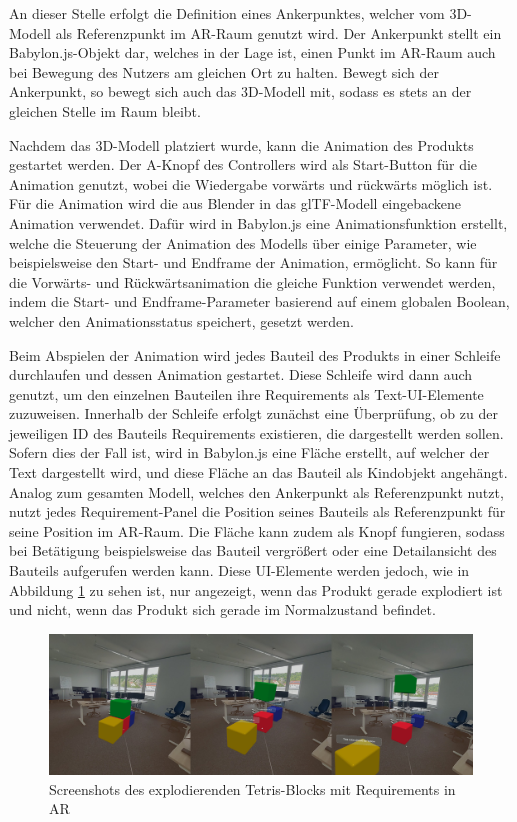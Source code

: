 An dieser Stelle erfolgt die Definition eines Ankerpunktes, welcher vom 3D-Modell als Referenzpunkt im AR-Raum genutzt wird.
Der Ankerpunkt stellt ein Babylon.js-Objekt dar, welches in der Lage ist, einen Punkt im AR-Raum auch bei Bewegung des Nutzers am gleichen Ort zu halten.
Bewegt sich der Ankerpunkt, so bewegt sich auch das 3D-Modell mit, sodass es stets an der gleichen Stelle im Raum bleibt.

Nachdem das 3D-Modell platziert wurde, kann die Animation des Produkts gestartet werden.
Der A-Knopf des Controllers wird als Start-Button für die Animation genutzt, wobei die Wiedergabe vorwärts und rückwärts möglich ist.
Für die Animation wird die aus Blender in das glTF-Modell eingebackene Animation verwendet.
Dafür wird in Babylon.js eine Animationsfunktion erstellt, welche die Steuerung der Animation des Modells über einige Parameter, wie beispielsweise den Start- und Endframe der Animation, ermöglicht.
So kann für die Vorwärts- und Rückwärtsanimation die gleiche Funktion verwendet werden, indem die Start- und Endframe-Parameter basierend auf einem globalen Boolean, welcher den Animationsstatus speichert, gesetzt werden.

Beim Abspielen der Animation wird jedes Bauteil des Produkts in einer Schleife durchlaufen und dessen Animation gestartet.
Diese Schleife wird dann auch genutzt, um den einzelnen Bauteilen ihre Requirements als Text-UI-Elemente zuzuweisen.
Innerhalb der Schleife erfolgt zunächst eine Überprüfung, ob zu der jeweiligen ID des Bauteils Requirements existieren, die dargestellt werden sollen.
Sofern dies der Fall ist, wird in Babylon.js eine Fläche erstellt, auf welcher der Text dargestellt wird, und diese Fläche an das Bauteil als Kindobjekt angehängt.
Analog zum gesamten Modell, welches den Ankerpunkt als Referenzpunkt nutzt, nutzt jedes Requirement-Panel die Position seines Bauteils als Referenzpunkt für seine Position im AR-Raum.
Die Fläche kann zudem als Knopf fungieren, sodass bei Betätigung beispielsweise das Bauteil vergrößert oder eine Detailansicht des Bauteils aufgerufen werden kann.
Diese UI-Elemente werden jedoch, wie in Abbildung \ref{fig:tetris-explosion} zu sehen ist, nur angezeigt, wenn das Produkt gerade \glqq{}explodiert\grqq{} ist und nicht, wenn das Produkt sich gerade im Normalzustand befindet.

\begin{figure}[H]
    \centering
    \includegraphics[width=1\textwidth]{images/tetris-explosion.png}
    \caption{Screenshots des explodierenden Tetris-Blocks mit Requirements in AR}
    \label{fig:tetris-explosion}
\end{figure}

